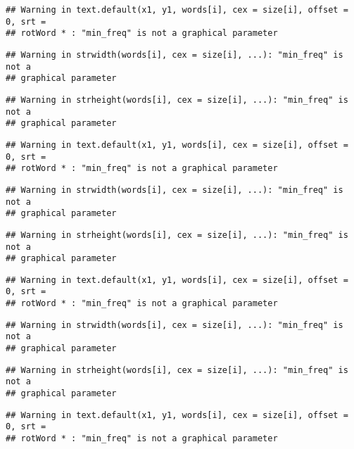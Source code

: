 \documentclass[]{article}
\begin{document}
\begin{verbatim}
## Warning in text.default(x1, y1, words[i], cex = size[i], offset = 0, srt =
## rotWord * : "min_freq" is not a graphical parameter
\end{verbatim}

\begin{verbatim}
## Warning in strwidth(words[i], cex = size[i], ...): "min_freq" is not a
## graphical parameter
\end{verbatim}

\begin{verbatim}
## Warning in strheight(words[i], cex = size[i], ...): "min_freq" is not a
## graphical parameter
\end{verbatim}

\begin{verbatim}
## Warning in text.default(x1, y1, words[i], cex = size[i], offset = 0, srt =
## rotWord * : "min_freq" is not a graphical parameter
\end{verbatim}

\begin{verbatim}
## Warning in strwidth(words[i], cex = size[i], ...): "min_freq" is not a
## graphical parameter
\end{verbatim}

\begin{verbatim}
## Warning in strheight(words[i], cex = size[i], ...): "min_freq" is not a
## graphical parameter
\end{verbatim}

\begin{verbatim}
## Warning in text.default(x1, y1, words[i], cex = size[i], offset = 0, srt =
## rotWord * : "min_freq" is not a graphical parameter
\end{verbatim}

\begin{verbatim}
## Warning in strwidth(words[i], cex = size[i], ...): "min_freq" is not a
## graphical parameter
\end{verbatim}

\begin{verbatim}
## Warning in strheight(words[i], cex = size[i], ...): "min_freq" is not a
## graphical parameter
\end{verbatim}

\begin{verbatim}
## Warning in text.default(x1, y1, words[i], cex = size[i], offset = 0, srt =
## rotWord * : "min_freq" is not a graphical parameter
\end{verbatim}
\end{document}
